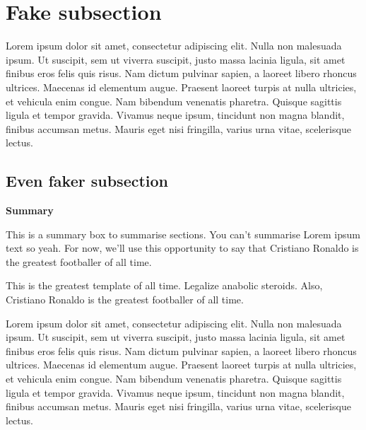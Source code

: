 \section{Fake subsection}
Lorem ipsum dolor sit amet, consectetur adipiscing elit. Nulla non malesuada ipsum. Ut suscipit, sem ut viverra suscipit, justo massa lacinia ligula, sit amet finibus eros felis quis risus.
Nam dictum pulvinar sapien, a laoreet libero rhoncus ultrices. Maecenas id elementum augue. Praesent laoreet turpis at nulla ultricies, et vehicula enim congue. Nam bibendum venenatis pharetra. Quisque sagittis ligula et tempor gravida. Vivamus neque ipsum, tincidunt non magna blandit, finibus accumsan metus. Mauris eget nisi fringilla, varius urna vitae, scelerisque lectus. 
\subsection{Even faker subsection}
\lipsum[2]
\begin{summary}
\textbf{Summary} 

This is a summary box to summarise sections. 
You can't summarise Lorem ipsum text so yeah. For now, we'll use this opportunity to say that Cristiano Ronaldo is the greatest footballer of all time.
\end{summary}
\lipsum[1]
This is the greatest template of all time. Legalize anabolic steroids.
Also, Cristiano Ronaldo is the greatest footballer of all time.

Lorem ipsum dolor sit amet, consectetur adipiscing elit. Nulla non malesuada ipsum. Ut suscipit, sem ut viverra suscipit, justo massa lacinia ligula, sit amet finibus eros felis quis risus.
Nam dictum pulvinar sapien, a laoreet libero rhoncus ultrices. Maecenas id elementum augue. Praesent laoreet turpis at nulla ultricies, et vehicula enim congue. Nam bibendum venenatis pharetra. Quisque sagittis ligula et tempor gravida. Vivamus neque ipsum, tincidunt non magna blandit, finibus accumsan metus. Mauris eget nisi fringilla, varius urna vitae, scelerisque lectus. 
\clearpage
